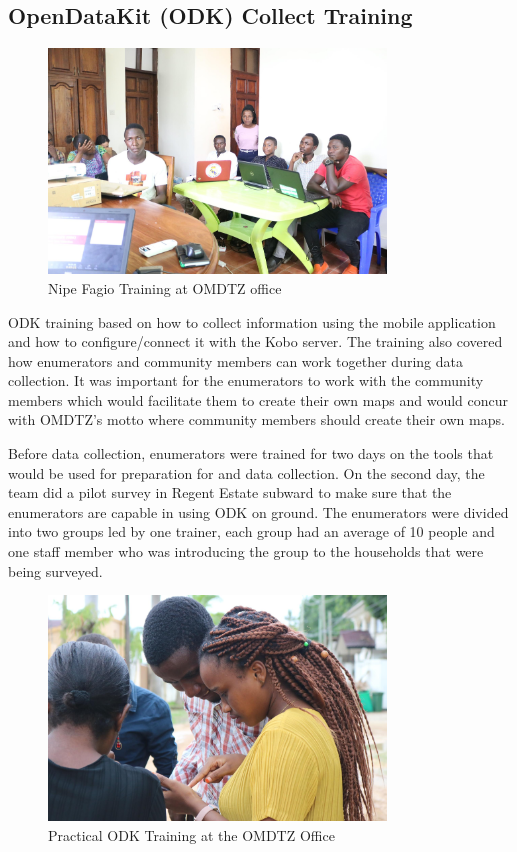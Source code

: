 \documentclass[a4paper,12pt,twoside]{article}
\begin{document}
\subsection{OpenDataKit (ODK) Collect Training}
    
    \begin{figure} %
        \centering
        \includegraphics[width=0.8\textwidth]{images/image4.jpg}
        \caption{Nipe Fagio Training at OMDTZ office}
    \end{figure}
    
    ODK training based on how to collect information using the mobile application and how to configure/connect it with the Kobo server. The training also covered how enumerators and community members can work together during data collection. It was important for the enumerators to work with the community members which would facilitate them to create their own maps and would concur with OMDTZ’s motto where community members should create their own maps. 
    
    Before data collection, enumerators were trained for two days on the tools that would be used for preparation for and data collection. On the second day, the team did a pilot survey in Regent Estate subward to make sure that the enumerators are capable in using ODK on ground. The enumerators were divided into two groups led by one trainer, each group had an average of 10 people and one staff member who was introducing the group to the households that were being surveyed. 
    
    \begin{figure} %
        \centering
        \includegraphics[width=0.8\textwidth]{images/image16.jpg}
        \caption{Practical ODK Training at the OMDTZ Office}
    \end{figure}
\end{document}
